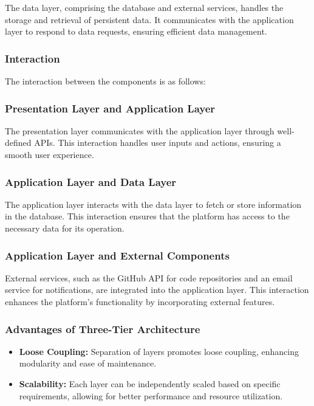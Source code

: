 \documentclass{article}
\begin{document}
The data layer, comprising the database and external services, handles the storage and 
retrieval of persistent data. It communicates with the application layer to respond to data 
requests, ensuring efficient data management.


\subsubsection{Interaction}
The interaction between the components is as follows:

\subsubsection*{Presentation Layer and Application Layer}
The presentation layer communicates with the application layer through well-defined APIs. This interaction handles user inputs and actions, ensuring a smooth user experience.

\subsubsection*{Application Layer and Data Layer}
The application layer interacts with the data layer to fetch or store information in the database. This interaction ensures that the platform has access to the necessary data for its operation.

\subsubsection*{Application Layer and External Components}
External services, such as the GitHub API for code repositories and an email service for notifications, are integrated into the application layer. This interaction enhances the platform's functionality by incorporating external features.

\subsubsection{Advantages of Three-Tier Architecture}

\begin{itemize}
    \item \textbf{Loose Coupling:} Separation of layers promotes loose coupling, enhancing 
    modularity and ease of maintenance.
    \item \textbf{Scalability:} Each layer can be independently scaled based on specific 
    requirements, allowing for better performance and resource utilization.
\end{itemize}
\end{document}
